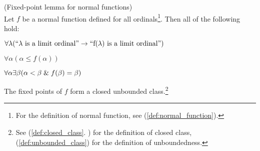 % 
%
%

\begin{lemma}{(Fixed-point lemma for normal functions)}\label{lemma:normal_fixed_point}\\
Let $f$ be a normal function defined for all ordinals\footnote{For the definition of normal function, see (\ref{def:normal_function}).}. Then all of the following hold:
\bce[(i)]
\item $\forall \lambda(\mbox{``$\lambda$ is a limit ordinal''} \rightarrow \mbox{``f($\lambda$) is a limit ordinal''})$
\item $\forall \alpha (\alpha \leq f(\alpha))$
\item $\forall \alpha \exists \beta (\alpha < \beta \mathrel{\&} f(\beta) = \beta)$
\item The fixed points of $f$ form a closed unbounded class.\footnote{See (\ref{def:closed_class}.%
) for the definition of closed class, (\ref{def:unbounded_class}) for the definition of unboundedness.}
\ece
\end{lemma}

